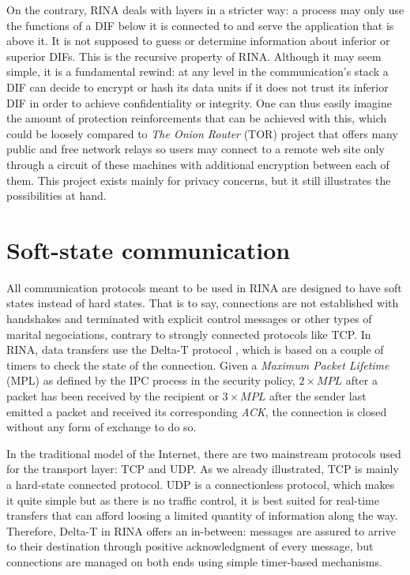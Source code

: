 \documentclass[a4paper]{proc}
\begin{document}
On the contrary, RINA deals with layers in a stricter way: a process may only
use the functions of a DIF below it is connected to and serve the application
that is above it. It is not supposed to guess or determine information about
inferior or superior DIFs. This is the recursive property of RINA\@. Although it
may seem simple, it is a fundamental rewind: at any level in the communication's
stack a DIF can decide to encrypt or hash its data units if it does not trust
its inferior DIF in order to achieve confidentiality or integrity. One can thus
easily imagine the amount of protection reinforcements that can be achieved with
this, which could be loosely compared to \textit{The Onion Router} (TOR) project
that offers many public and free network relays so users may connect to a remote
web site only through a circuit of these machines with additional encryption
between each of them. This project exists mainly for privacy concerns, but it
still illustrates the possibilities at hand.

\section{Soft-state communication}

All communication protocols meant to be used in RINA are designed to have soft
states instead of hard states. That is to say, connections are not established
with handshakes and terminated with explicit control messages or other types of
marital negociations, contrary to strongly connected protocols like TCP\@. In
RINA, data transfers use the Delta-T protocol \cite{delta-t}, which is based on
a couple of timers to check the state of the connection. Given a \textit{Maximum
Packet Lifetime} (MPL) as defined by the IPC process in the security policy, $2
\times MPL$ after a packet has been received by the recipient or $3 \times MPL$
after the sender last emitted a packet and received its corresponding
\textit{ACK}, the connection is closed without any form of exchange to do so.

In the traditional model of the Internet, there are two mainstream protocols
used for the transport layer: TCP and UDP. As we already illustrated, TCP is
mainly a hard-state connected protocol. UDP is a connectionless protocol, which
makes it quite simple but as there is no traffic control, it is best suited for
real-time transfers that can afford loosing a limited quantity of information
along the way. Therefore, Delta-T in RINA offers an in-between: messages are
assured to arrive to their destination through positive acknowledgment of every
message, but connections are managed on both ends using simple timer-based
mechanisms.
\end{document}
